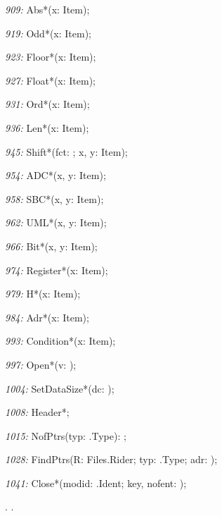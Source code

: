 \item{\it 909:} Abs*(\VAR x: Item);
\item{\it 919:} Odd*(\VAR x: Item);
\item{\it 923:} Floor*(\VAR x: Item);
\item{\it 927:} Float*(\VAR x: Item);
\item{\it 931:} Ord*(\VAR x: Item);
\item{\it 936:} Len*(\VAR x: Item);
\item{\it 945:} Shift*(fct: \LONGINT; \VAR x, y: Item);
\item{\it 954:} ADC*(\VAR x, y: Item);
\item{\it 958:} SBC*(\VAR x, y: Item);
\item{\it 962:} UML*(\VAR x, y: Item);
\item{\it 966:} Bit*(\VAR x, y: Item);
\item{\it 974:} Register*(\VAR x: Item);
\item{\it 979:} H*(\VAR x: Item);
\item{\it 984:} Adr*(\VAR x: Item);
\item{\it 993:} Condition*(\VAR x: Item);
\item{\it 997:} Open*(v: \INTEGER);
\item{\it 1004:} SetDataSize*(dc: \LONGINT);
\item{\it 1008:} Header*;
\item{\it 1015:} NofPtrs(typ: \ORB.Type): \LONGINT;
\item{\it 1028:} FindPtrs(\VAR R: Files.Rider; typ: \ORB.Type; adr: \LONGINT);
\item{\it 1041:} Close*(\VAR modid: \ORS.Ident; key, nofent: \LONGINT);

. \ORP.


